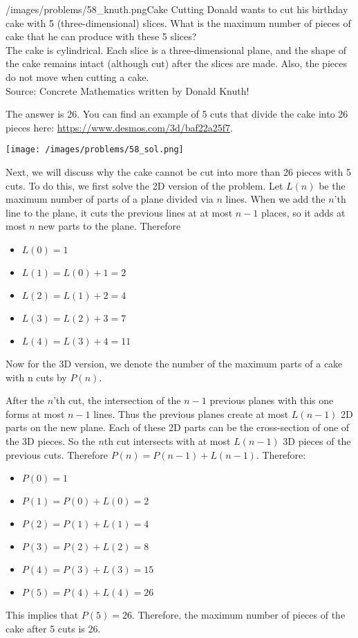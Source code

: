 \begin{problem}{/images/problems/58_knuth.png}{Cake Cutting}  Donald wants to cut his birthday cake with 5 (three-dimensional) slices. What is the maximum number of pieces of cake that he can produce with these 5 slices?\\[0.2cm]
	
	The cake is cylindrical. Each slice is a three-dimensional plane, and the shape of the cake remains intact (although cut) after the slices are made. Also, the pieces do not move when cutting a cake.\\[0.2cm]
	
	Source:  Concrete Mathematics written by Donald Knuth!
\end{problem}

\begin{solution}
	The answer is 26. You can find an example of 5 cuts that divide the cake into 26 pieces here: \url{https://www.desmos.com/3d/baf22a25f7}.\\[0.2cm]
	\begin{center}
	\texttt{[image: /images/problems/58\_sol.png]}
	\end{center}
	Next, we will discuss why the cake cannot be cut into more than 26 pieces with 5 cuts. To do this, we first solve the 2D version of the problem. Let $L(n)$ be the maximum number of parts of a plane divided via $n$ lines. When we add the $n$'th line to the plane, it cuts the previous lines at at most $n-1$ places, so it adds at most $n$ new parts to the plane. Therefore
	\begin{itemize}
		\item $L(0)=1$
		\item $L(1)=L(0)+1=2$
		\item $L(2)=L(1)+2=4$
		\item $L(3)=L(2)+3=7$
		\item $L(4)=L(3)+4=11$
	\end{itemize}
	
	Now for the 3D version, we denote the number of the maximum parts of a cake with n cuts by $P(n)$.
	
	After the $n$'th cut, the intersection of the $n-1$ previous planes with this one forms at most $n-1$ lines. Thus the previous planes create at most $L(n-1)$ 2D parts on the new plane. Each of these 2D parts can be the cross-section of one of the 3D pieces. So the $n$th cut intersects with at most $L(n-1)$ 3D pieces of the previous cuts. Therefore $ P(n)=P(n-1)+L(n-1)$. Therefore:
	\begin{itemize}
		\item $P(0)=1$
		\item $P(1)=P(0)+L(0)=2$
		\item $P(2)=P(1)+L(1)=4$
		\item $P(3)=P(2)+L(2)=8$
		\item $P(4)=P(3)+L(3)=15$
		\item $P(5)=P(4)+L(4)=26$
	\end{itemize}
	This implies that  $P(5)=26$. Therefore, the maximum number of pieces of the cake after 5 cuts is 26.
\end{solution}


